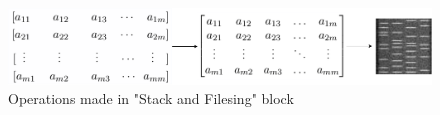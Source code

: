 
\begin{figure}[!htb]
    \centering
    \includegraphics[width=\textwidth]{figures/stack_n_save}
    \caption{Operations made in "Stack and Filesing" block}
    \label{fig:stacknsave}
\end{figure}

